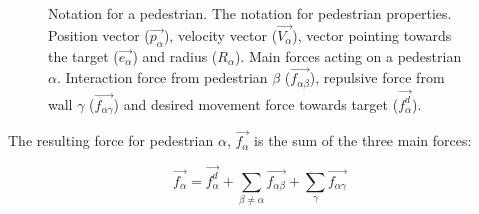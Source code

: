 \begin{figure}[ht]
    \centering
    \caption[Notation for pedestrians]{Notation for a pedestrian.  
     The notation for pedestrian properties. Position 
    vector ($ \overrightarrow{p_{\alpha}} $), velocity vector ($ 
    \overrightarrow{V_{\alpha}} $), vector pointing towards the target 
    ($\overrightarrow{e_{\alpha}}$)  and radius ($ R_{\alpha} $).
     Main forces acting on a pedestrian $\alpha$.  
    Interaction force from pedestrian $\beta$ 
    ($\overrightarrow{f_{\alpha\beta}}$), repulsive force from wall $\gamma$ 
    ($\overrightarrow{f_{\alpha \gamma}}$) and desired movement force towards 
    target ($\overrightarrow{f^{d}_{\alpha}}$).}

    \label{pedestrian-notation}
\end{figure}

The resulting force for pedestrian $\alpha$, $\overrightarrow{f_{\alpha}}$ is 
the sum of the three main forces:

\begin{equation}\label{model}
    \overrightarrow{f_{\alpha}} = \overrightarrow{f^{d}_{\alpha}} +
    \sum_{\beta \neq \alpha} \overrightarrow{f_{\alpha \beta}} +
    \sum_{\gamma} \overrightarrow{f_{\alpha \gamma}}
\end{equation}

